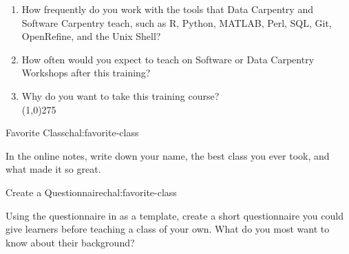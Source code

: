 \begin{enumerate}
\item
  How frequently do you work with the tools that Data Carpentry and
  Software Carpentry teach, such as R, Python, MATLAB, Perl, SQL, Git,
  OpenRefine, and the Unix Shell?


\item
  How often would you expect to teach on Software or Data Carpentry
  Workshops after this training?


\item
  Why do you want to take this training course?\\
  \line(1,0){275}

\end{enumerate}


\begin{challenge}{Favorite Class}{chal:favorite-class}

In the online notes, write down your name, the best class you ever
took, and what made it so great.

\end{challenge}

\begin{challenge}{Create a Questionnaire}{chal:favorite-class}

Using the questionnaire in  as a template,
create a short questionnaire you could give learners before teaching a
class of your own.  What do you most want to know about their
background?

\end{challenge}
